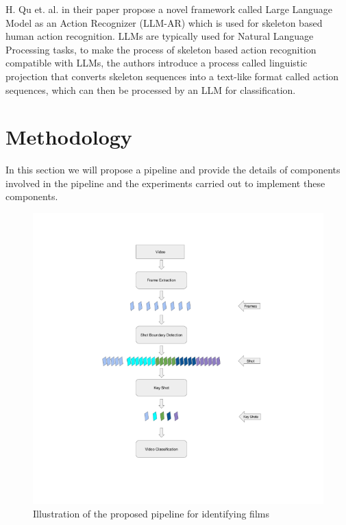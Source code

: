 \documentclass[12pt]{report}
\begin{document}
	\cite{llms} H. Qu et. al. in their paper propose a novel framework called Large Language Model as an Action Recognizer (LLM-AR) which is used for skeleton based human action recognition. LLMs are typically used for Natural Language Processing tasks, to make the process of skeleton based action recognition compatible with LLMs, the authors introduce a process called linguistic projection that converts skeleton sequences into a text-like format called action sequences, which can then be processed by an LLM for classification.
	
	
	
	
	
	
	
	
	
	
	

	\newpage
	\chapter{Methodology}
	In this section we will propose a pipeline and provide the details of components involved in the pipeline and the experiments carried out to implement these components.
	\begin{figure}[h]  %
		\centering
		\includegraphics[width=\linewidth]{entire_pipeline.png}  %
		\caption{Illustration of the proposed pipeline for identifying films}
		\label{fig:entire_pipeline}
	\end{figure}
\end{document}
